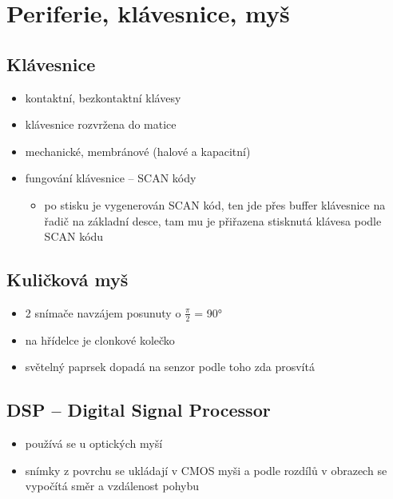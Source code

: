 \documentclass[a4paper,12pt]{article}
\providecommand{\tightlist}{%
\setlength{\itemsep}{0pt}\setlength{\parskip}{0pt}}
\begin{document}
\section{Periferie, klávesnice, myš}

\subsection{Klávesnice}

\begin{itemize}
\tightlist
\item kontaktní, bezkontaktní klávesy
\item klávesnice rozvržena do matice
\item mechanické, membránové (halové a kapacitní)
\item fungování klávesnice -- SCAN kódy

  \begin{itemize}
  \tightlist
  \item po stisku je vygenerován SCAN kód, ten jde přes buffer klávesnice na
    řadič na základní desce, tam mu je přiřazena stisknutá klávesa podle
    SCAN kódu
  \end{itemize}
\end{itemize}

\subsection{Kuličková myš}

\begin{itemize}
\tightlist
\item 2 snímače navzájem posunuty o $\frac{\pi}{2}$ = 90°
\item na hřídelce je clonkové kolečko
\item světelný paprsek dopadá na senzor podle toho zda prosvítá
\end{itemize}

\subsection{DSP -- Digital Signal
Processor}

\begin{itemize}
\tightlist
\item používá se u optických myší
\item snímky z povrchu se ukládají v CMOS myši a podle rozdílů v obrazech se
  vypočítá směr a vzdálenost pohybu
\end{itemize}
\end{document}
